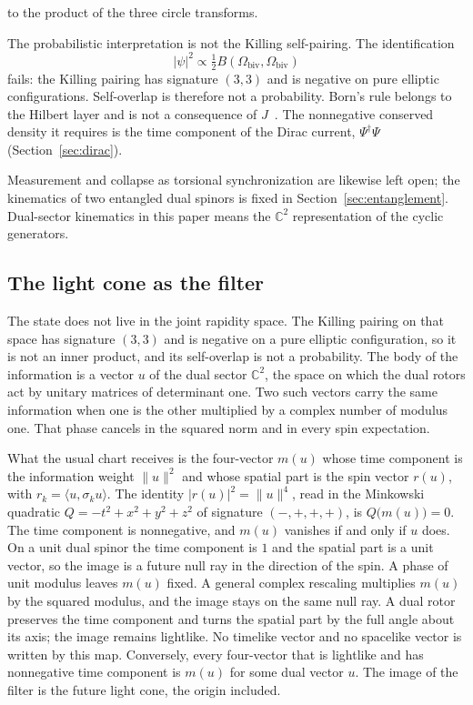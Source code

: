 \documentclass[a4paper]{article}
\begin{document}
to the product of the three circle transforms.

The probabilistic interpretation is not the Killing self-pairing. The identification
\[
|\psi|^2 \propto \tfrac12 B(\Omega_{\mathrm{biv}},\Omega_{\mathrm{biv}})
\]
fails: the Killing pairing has signature $(3,3)$ and is negative on pure elliptic configurations. Self-overlap is therefore not a probability. Born's rule belongs to the Hilbert layer and is not a consequence of $J$~\cite{dst-d4l}. The nonnegative conserved density it requires is the time component of the Dirac current, $\Psi^\dagger\Psi$ (Section~\ref{sec:dirac}).

Measurement and collapse as torsional synchronization are likewise left open; the kinematics of two entangled dual spinors is fixed in Section~\ref{sec:entanglement}. Dual-sector kinematics in this paper means the $\mathbb{C}^2$ representation of the cyclic generators.

\subsection{The light cone as the filter}
\label{sec:lightfilter}

The state does not live in the joint rapidity space. The Killing pairing on that space has signature $(3,3)$ and is negative on a pure elliptic configuration, so it is not an inner product, and its self-overlap is not a probability. The body of the information is a vector $u$ of the dual sector $\mathbb{C}^2$, the space on which the dual rotors act by unitary matrices of determinant one. Two such vectors carry the same information when one is the other multiplied by a complex number of modulus one. That phase cancels in the squared norm and in every spin expectation.

What the usual chart receives is the four-vector $m(u)$ whose time component is the information weight $\lVert u\rVert^2$ and whose spatial part is the spin vector $r(u)$, with $r_k=\langle u,\sigma_k u\rangle$. The identity $|r(u)|^2=\lVert u\rVert^4$, read in the Minkowski quadratic $Q=-t^2+x^2+y^2+z^2$ of signature $(-,+,+,+)$, is $Q\bigl(m(u)\bigr)=0$. The time component is nonnegative, and $m(u)$ vanishes if and only if $u$ does. On a unit dual spinor the time component is $1$ and the spatial part is a unit vector, so the image is a future null ray in the direction of the spin. A phase of unit modulus leaves $m(u)$ fixed. A general complex rescaling multiplies $m(u)$ by the squared modulus, and the image stays on the same null ray. A dual rotor preserves the time component and turns the spatial part by the full angle about its axis; the image remains lightlike. No timelike vector and no spacelike vector is written by this map. Conversely, every four-vector that is lightlike and has nonnegative time component is $m(u)$ for some dual vector $u$. The image of the filter is the future light cone, the origin included.
\end{document}
